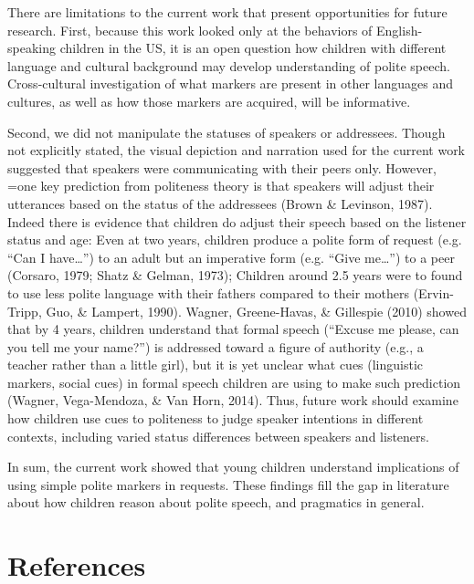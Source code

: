 \documentclass[10pt, letterpaper]{article}
\begin{document}
There are limitations to the current work that present opportunities for
future research. First, because this work looked only at the behaviors
of English-speaking children in the US, it is an open question how
children with different language and cultural background may develop
understanding of polite speech. Cross-cultural investigation of what
markers are present in other languages and cultures, as well as how
those markers are acquired, will be informative.

Second, we did not manipulate the statuses of speakers or addressees.
Though not explicitly stated, the visual depiction and narration used
for the current work suggested that speakers were communicating with
their peers only. However, =one key prediction from politeness theory is
that speakers will adjust their utterances based on the status of the
addressees (Brown \& Levinson, 1987). Indeed there is evidence that
children do adjust their speech based on the listener status and age:
Even at two years, children produce a polite form of request (e.g. ``Can
I have\ldots{}'') to an adult but an imperative form (e.g. ``Give
me\ldots{}'') to a peer (Corsaro, 1979; Shatz \& Gelman, 1973); Children
around 2.5 years were to found to use less polite language with their
fathers compared to their mothers (Ervin-Tripp, Guo, \& Lampert, 1990).
Wagner, Greene-Havas, \& Gillespie (2010) showed that by 4 years,
children understand that formal speech (``Excuse me please, can you tell
me your name?'') is addressed toward a figure of authority (e.g., a
teacher rather than a little girl), but it is yet unclear what cues
(linguistic markers, social cues) in formal speech children are using to
make such prediction (Wagner, Vega-Mendoza, \& Van Horn, 2014). Thus,
future work should examine how children use cues to politeness to judge
speaker intentions in different contexts, including varied status
differences between speakers and listeners.

In sum, the current work showed that young children understand
implications of using simple polite markers in requests. These findings
fill the gap in literature about how children reason about polite
speech, and pragmatics in general.

\section{References}\label{references}

\setlength{\parindent}{-0.1in} \setlength{\leftskip}{0.125in} \noindent
\end{document}
